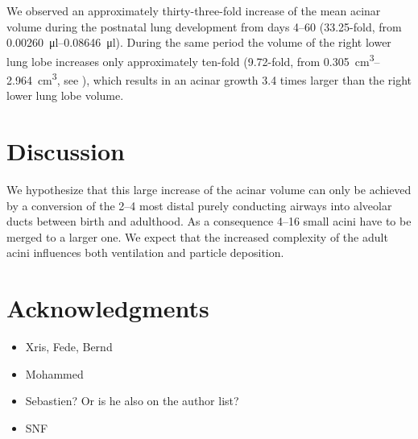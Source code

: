 \documentclass[%
	paper=a4,%
	twoside=true,%
	draft=false,%
	abstract=false]{scrartcl}
\begin{document}
We observed an approximately thirty-three-fold increase of the mean acinar volume during the postnatal lung development from days \numrange{4}{60} (33.25-fold, from \SIrange{0.00260}{0.08646}{\micro\litre}). During the same period the volume of the right lower lung lobe increases only approximately ten-fold (9.72-fold, from \SIrange{0.305}{2.964}{\centi\metre\cubed}, see \cite{Tschanz2003}), which results in an acinar growth 3.4 times larger than the right lower lung lobe volume.

\section{Discussion}\label{sec:Discussion}
We hypothesize that this large increase of the acinar volume can only be achieved by a conversion of the \numrange{2}{4} most distal purely conducting airways into alveolar ducts between birth and adulthood. As a consequence \numrange{4}{16} small acini have to be merged to a larger one. We expect that the increased complexity of the adult acini influences both ventilation and particle deposition.

\section{Acknowledgments}
\begin{itemize}
	\item Xris, Fede, Bernd
	\item Mohammed
	\item Sebastien? Or is he also on the author list?
	\item SNF
\end{itemize}


 
\end{document}

